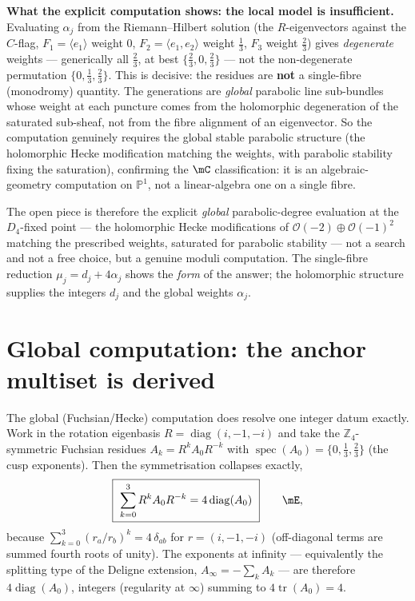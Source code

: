 \documentclass[11pt,a4paper]{article}
\theoremstyle{definition}
\begin{document}
\par\smallskip\noindent\textbf{What the explicit computation shows: the local model is insufficient.}
Evaluating $\alpha_j$ from the Riemann--Hilbert solution (the $R$-eigenvectors against the $C$-flag,
$F_1{=}\langle e_1\rangle$ weight $0$, $F_2{=}\langle e_1,e_2\rangle$ weight $\tfrac13$, $F_3$ weight
$\tfrac23$) gives \emph{degenerate} weights --- generically all $\tfrac23$, at best $\{\tfrac23,0,\tfrac23\}$
--- not the non-degenerate permutation $\{0,\tfrac13,\tfrac23\}$. This is decisive: the residues are
\textbf{not} a single-fibre (monodromy) quantity. The generations are \emph{global} parabolic line
sub-bundles whose weight at each puncture comes from the holomorphic degeneration of the saturated
sub-sheaf, not from the fibre alignment of an eigenvector. So the computation genuinely requires the
global stable parabolic structure (the holomorphic Hecke modification matching the weights, with
parabolic stability fixing the saturation), confirming the $\mC$ classification: it is an
algebraic-geometry computation on $\mathbb P^1$, not a linear-algebra one on a single fibre.
\par\smallskip

\noindent The open piece is therefore the explicit \emph{global} parabolic-degree evaluation at the
$D_4$-fixed point --- the holomorphic Hecke modifications of $\mathcal O(-2)\oplus\mathcal O(-1)^2$
matching the prescribed weights, saturated for parabolic stability --- not a search and not a free
choice, but a genuine moduli computation. The single-fibre reduction $\mu_j=d_j+4\alpha_j$ shows the
\emph{form} of the answer; the holomorphic structure supplies the integers $d_j$ and the global weights
$\alpha_j$.

\section{Global computation: the anchor multiset is derived}
The global (Fuchsian/Hecke) computation does resolve one integer datum exactly. Work in the rotation
eigenbasis $R=\operatorname{diag}(i,-1,-i)$ and take the $\mathbb Z_4$-symmetric Fuchsian residues
$A_k=R^kA_0R^{-k}$ with $\operatorname{spec}(A_0)=\{0,\tfrac13,\tfrac23\}$ (the cusp exponents). Then the
symmetrisation collapses exactly,
\begin{equation}
  \boxed{\ \sum_{k=0}^{3}R^kA_0R^{-k}=4\operatorname{diag}(A_0)\ }\qquad\mE ,
\end{equation}
because $\sum_{k=0}^3(r_a/r_b)^k=4\,\delta_{ab}$ for $r=(i,-1,-i)$ (off-diagonal terms are summed fourth
roots of unity). The exponents at infinity --- equivalently the splitting type of the Deligne extension,
$A_\infty=-\sum_k A_k$ --- are therefore $4\operatorname{diag}(A_0)$, integers (regularity at $\infty$)
summing to $4\operatorname{tr}(A_0)=4$.
\end{document}
